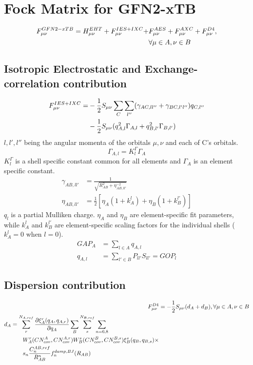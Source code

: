 \section{Fock Matrix for GFN2-xTB}
\begin{equation}
\begin{split}
    F^{GFN2-xTB}_{\mu\nu} =  H^{EHT}_{\mu\nu} + F^{IES+IXC}_{\mu\nu} + &F^{AES}_{\mu\nu}+F^{AXC}_{\mu\nu}+F^{D4}_{\mu\nu}, \\&\forall \mu \in A, \nu \in B
\end{split}
\end{equation}
\subsection{Isotropic Electrostatic and Exchange-correlation contribution}
\begin{equation}
\begin{split}
    F^{IES+IXC}_{\mu\nu} = &- \frac{1}{2}S_{\mu\nu}\sum_C\sum_{l''}(\gamma_{AC,ll''}+\gamma_{BC,l'l''})q_{C,l''}\\
    &-\frac{1}{2}S_{\mu\nu}(q_{A,l}^2\Gamma_{A,l}+q_{B,l'}^2\Gamma_{B,l'})
\end{split}
\end{equation}
$l,l',l''$ being the angular momenta of the orbitals $\mu, \nu$ and each of C's orbitals. 
\begin{equation}
    \Gamma_{A,l} = K^\Gamma_l\Gamma_A
\end{equation}
$K^\Gamma_l$ is a shell specific constant common for all elements and $\Gamma_A$ is an element specific constant. 
\begin{align}
    \gamma_{AB,ll'} &= \frac{1}{\sqrt{R_{AB}^2+\eta^{-2}_{AB,ll'}}}\\
    \eta_{AB,ll'}&=\frac{1}{2}\left[\eta_A(1+k_A^l)+\eta_B(1+k_B^{l'})\right]
\end{align}
$q_l$ is a partial Mulliken charge. $\eta_A$ and $\eta_B$ are element-specific fit parameters, while $k_A^l$ and $k_B^{l'}$ are element-specific scaling factors for the individual shells ($k_A^l=0$ when $l=0$).
\begin{align}
    GAP_A &= \sum_{l \in A} q_{A,l}\\
    q_{A,l} &= \sum_{l'\in B}P_{ll'}S_{ll'} = GOP_l
\end{align}


\subsection{Dispersion contribution}
\begin{align}
    F^{D4}_{\mu\nu} &= -\frac{1}{2}S_{\mu\nu}(d_A+d_B), \forall \mu \in A, \nu \in B\\
\begin{split}
    d_A &= \sum_r^{N_{A,ref}} \frac{\partial \xi^r_A(q_A,q_{A,r})}{\partial q_A}\sum_B\sum_s^{N_{B,ref}}\sum_{n=6,8}\\
    &\quad\quad W_A^r(CN^A_{cov},CN^{A,r}_{cov})W_B^s(CN^B_{cov},CN^{B,s}_{cov})\xi^s_B(q_B,q_{B,s})\times\\
    &\quad\quad s_n\frac{C^{AB,ref}_n}{R_{AB}^n}f_n^{damp,BJ}(R_{AB}) 
\end{split}
\end{align}
